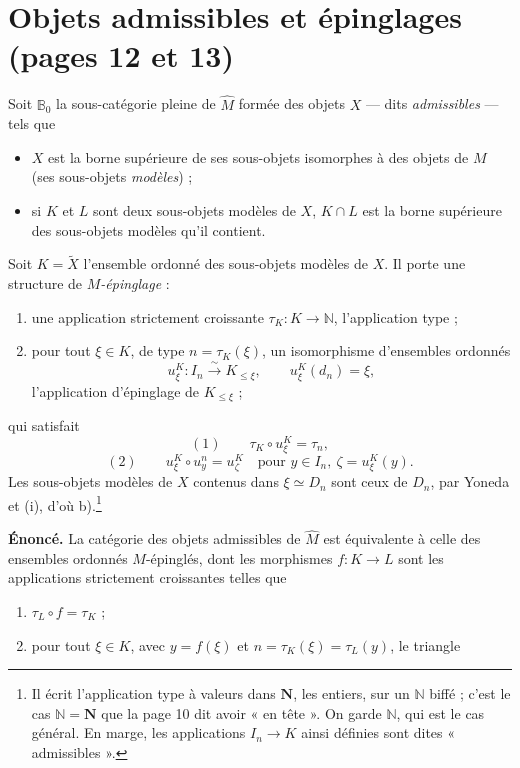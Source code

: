 \documentclass[11pt,a4paper]{article}
\begin{document}
\section*{Objets admissibles et épinglages (pages 12 et 13)}

Soit $\mathbb{B}_{0}$ la sous-catégorie pleine de $\widehat{M}$ formée des
objets $X$ --- dits \emph{admissibles} --- tels que
\begin{itemize}
\item $X$ est la borne supérieure de ses sous-objets isomorphes à des objets de
$M$ (ses sous-objets \emph{modèles}) ;
\item si $K$ et $L$ sont deux sous-objets modèles de $X$, $K \cap L$ est la
borne supérieure des sous-objets modèles qu'il contient.
\end{itemize}

Soit $K = \widetilde{X}$ l'ensemble ordonné des sous-objets modèles de $X$. Il
porte une structure de \emph{$M$-épinglage} :
\begin{enumerate}
\item[a)] une application strictement croissante
$\tau_{K} : K \to \mathbb{N}$, l'application type ;
\item[b)] pour tout $\xi \in K$, de type $n = \tau_{K}(\xi)$, un isomorphisme
d'ensembles ordonnés
\[
u^{K}_{\xi} : I_{n} \xrightarrow{\;\sim\;} K_{\leq \xi},
\qquad u^{K}_{\xi}(d_{n}) = \xi,
\]
l'application d'épinglage de $K_{\leq \xi}$ ;
\end{enumerate}
qui satisfait
\[
(1) \qquad \tau_{K} \circ u^{K}_{\xi} = \tau_{n},
\]
\[
(2) \qquad u^{K}_{\xi} \circ u^{n}_{y} = u^{K}_{\zeta}
\quad \text{pour } y \in I_{n},\ \zeta = u^{K}_{\xi}(y).
\]
Les sous-objets modèles de $X$ contenus dans $\xi \simeq D_{n}$ sont ceux de
$D_{n}$, par Yoneda et (i), d'où b).\footnote{Il écrit l'application type à
valeurs dans $\mathbf{N}$, les entiers, sur un $\mathbb{N}$ biffé ; c'est le
cas $\mathbb{N} = \mathbf{N}$ que la page 10 dit avoir « en tête ». On garde $\mathbb{N}$, qui est le cas
général. En marge, les applications $I_{n} \to K$ ainsi définies sont dites
« admissibles ».}

\textbf{Énoncé.} La catégorie des objets admissibles de $\widehat{M}$ est
équivalente à celle des ensembles ordonnés $M$-épinglés, dont les morphismes
$f : K \to L$ sont les applications strictement croissantes telles que
\begin{enumerate}
\item[a)] $\tau_{L} \circ f = \tau_{K}$ ;
\item[b)] pour tout $\xi \in K$, avec $y = f(\xi)$ et $n = \tau_{K}(\xi) =
\tau_{L}(y)$, le triangle
\end{enumerate}
\end{document}
